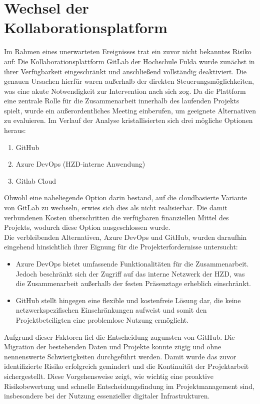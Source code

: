 \documentclass[12pt,oneside]{article}
\begin{document}
\section{Wechsel der Kollaborationsplatform}
Im Rahmen eines unerwarteten Ereignisses trat ein zuvor nicht bekanntes Risiko auf: Die Kollaborationsplattform GitLab der Hochschule Fulda wurde zunächst in ihrer Verfügbarkeit eingeschränkt und anschließend vollständig deaktiviert. Die genauen Ursachen hierfür waren außerhalb der direkten Steuerungsmöglichkeiten, was eine akute Notwendigkeit zur Intervention nach sich zog. 
Da die Plattform eine zentrale Rolle für die Zusammenarbeit innerhalb des laufenden Projekts spielt, wurde ein außerordentliches Meeting einberufen, um geeignete Alternativen zu evaluieren. Im Verlauf der Analyse kristallisierten sich drei mögliche Optionen heraus:

\begin{enumerate}
	\item GitHub
	\item Azure DevOps (HZD-interne Anwendung)
	\item Gitlab Cloud
\end{enumerate}

Obwohl eine naheliegende Option darin bestand, auf die cloudbasierte Variante von GitLab zu wechseln, erwies sich dies als nicht realisierbar. Die damit verbundenen Kosten überschritten die verfügbaren finanziellen Mittel des Projekts, wodurch diese Option ausgeschlossen wurde. \\

Die verbleibenden Alternativen, Azure DevOps und GitHub, wurden daraufhin eingehend hinsichtlich ihrer Eignung für die Projekterfordernisse untersucht:

\begin{itemize}
	\item Azure DevOps bietet umfassende Funktionalitäten für die Zusammenarbeit. Jedoch beschränkt sich der Zugriff auf das interne Netzwerk der HZD, was die Zusammenarbeit außerhalb der festen Präsenztage erheblich einschränkt.
	\item GitHub stellt hingegen eine flexible und kostenfreie Lösung dar, die keine netzwerkspezifischen Einschränkungen aufweist und somit den Projektbeteiligten eine problemlose Nutzung ermöglicht.
\end{itemize}

Aufgrund dieser Faktoren fiel die Entscheidung zugunsten von GitHub. Die Migration der bestehenden Daten und Projekte konnte zügig und ohne nennenswerte Schwierigkeiten durchgeführt werden. Damit wurde das zuvor identifizierte Risiko erfolgreich gemindert und die Kontinuität der Projektarbeit sichergestellt.
Diese Vorgehensweise zeigt, wie wichtig eine proaktive Risikobewertung und schnelle Entscheidungsfindung im Projektmanagement sind, insbesondere bei der Nutzung essenzieller digitaler Infrastrukturen.
\end{document}
